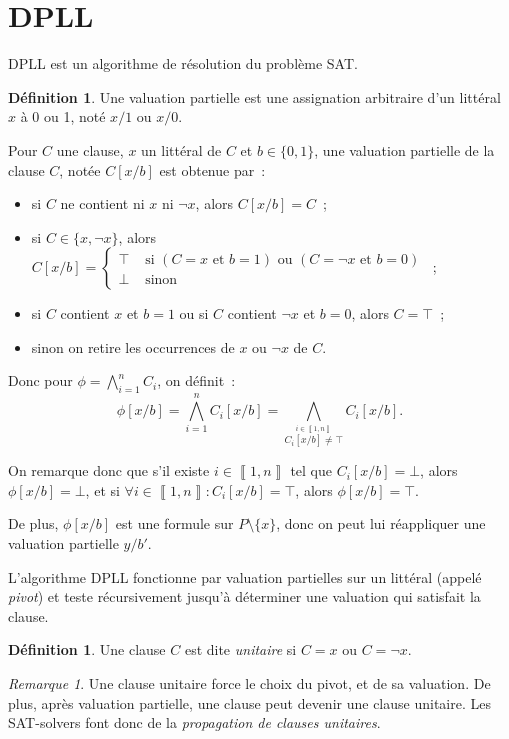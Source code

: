 \documentclass{article}
\theoremstyle{definition}
\newtheorem{déf}[thm]{Définition}
\theoremstyle{remark}
\newtheorem*{rmq}{Remarque}
\newcommand{\intint}[2]{\left\llbracket#1, #2\right\rrbracket}
\begin{document}
\section{DPLL}
	DPLL est un algorithme de résolution du problème SAT.

	\begin{déf} Une valuation partielle est une assignation arbitraire d'un littéral $x$ à 0 ou 1, noté $x/1$ ou $x/0$.
	\end{déf}

	Pour $C$ une clause, $x$ un littéral de $C$ et $b \in \{0, 1\}$, une valuation partielle de la clause $C$, notée $C[x/b]$ est obtenue par~:
	\begin{itemize}
		\item si $C$ ne contient ni $x$ ni $\lnot x$, alors $C[x/b] = C$~;
		\item si $C \in \{x, \lnot x\}$, alors $C[x/b] =
			\begin{cases}\top &\text{ si } \left(C = x \text{ et } b = 1\right) \text{ ou } \left(C =\lnot x \text{ et } b = 0\right) \\ \bot &\text{ sinon}\end{cases}$~;
		\item si $C$ contient $x$ et $b=1$ ou si $C$ contient $\lnot x$ et $b=0$, alors $C = \top$~;
		\item sinon on retire les occurrences de $x$ ou $\lnot x$ de $C$.
	\end{itemize}

	Donc pour $\phi = \bigwedge_{i=1}^nC_i$, on définit~:
	\[\phi[x/b] = \bigwedge_{i=1}^nC_i[x/b] = \bigwedge_{\stackrel {i \in \intint 1n}{C_i[x/b] \neq \top}}C_i[x/b].\]

	On remarque donc que s'il existe $i \in \intint 1n$ tel que $C_i[x/b] = \bot$, alors $\phi[x/b] = \bot$, et si $\forall i \in \intint 1n : C_i[x/b] = \top$,
	alors $\phi[x/b]=\top$.

	De plus, $\phi[x/b]$ est une formule sur $P \setminus \{x\}$, donc on peut lui réappliquer une valuation partielle $y/b'$.

	L'algorithme DPLL fonctionne par valuation partielles sur un littéral (appelé \textit{pivot}) et teste récursivement jusqu'à déterminer une valuation
	qui satisfait la clause.

	\begin{déf} Une clause $C$ est dite \textit{unitaire} si $C = x$ ou $C = \lnot x$.
	\end{déf}

	\begin{rmq} Une clause unitaire force le choix du pivot, et de sa valuation. De plus, après valuation partielle, une clause peut devenir une clause unitaire.
	Les SAT-solvers font donc de la \textit{propagation de clauses unitaires}.
	\end{rmq}
\end{document}
